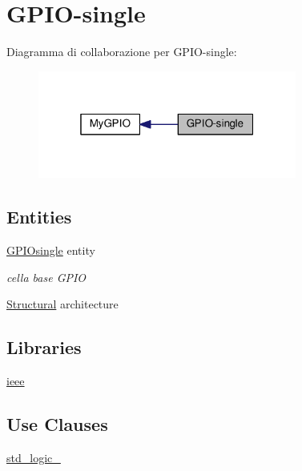\hypertarget{group___g_p_i_o-single}{\section{G\+P\+I\+O-\/single}
\label{group___g_p_i_o-single}
}
Diagramma di collaborazione per G\+P\+I\+O-\/single\+:\nopagebreak
\begin{figure}[H]
\begin{center}
\leavevmode
\includegraphics[width=241pt]{group___g_p_i_o-single}
\end{center}
\end{figure}
\subsection*{Entities}
\begin{DoxyCompactItemize}
\item 
\hyperlink{class_g_p_i_osingle}{G\+P\+I\+Osingle} entity
\begin{DoxyCompactList}\small\item\em cella base G\+P\+I\+O \end{DoxyCompactList}\item 
\hyperlink{class_g_p_i_osingle_1_1_structural}{Structural} architecture
\end{DoxyCompactItemize}
\subsection*{Libraries}
 \begin{DoxyCompactItemize}
\item 
\hypertarget{group___g_p_i_o-single_ga0a6af6eef40212dbaf130d57ce711256}{\hyperlink{group___g_p_i_o-single_ga0a6af6eef40212dbaf130d57ce711256}{ieee} }\label{group___g_p_i_o-single_ga0a6af6eef40212dbaf130d57ce711256}

\end{DoxyCompactItemize}
\subsection*{Use Clauses}
 \begin{DoxyCompactItemize}
\item 
\hypertarget{group___g_p_i_o-single_gacd03516902501cd1c7296a98e22c6fcb}{\hyperlink{group___g_p_i_o-single_gacd03516902501cd1c7296a98e22c6fcb}{std\+\_\+logic\+\_}   }\label{group___g_p_i_o-single_gacd03516902501cd1c7296a98e22c6fcb}

\end{DoxyCompactItemize}
